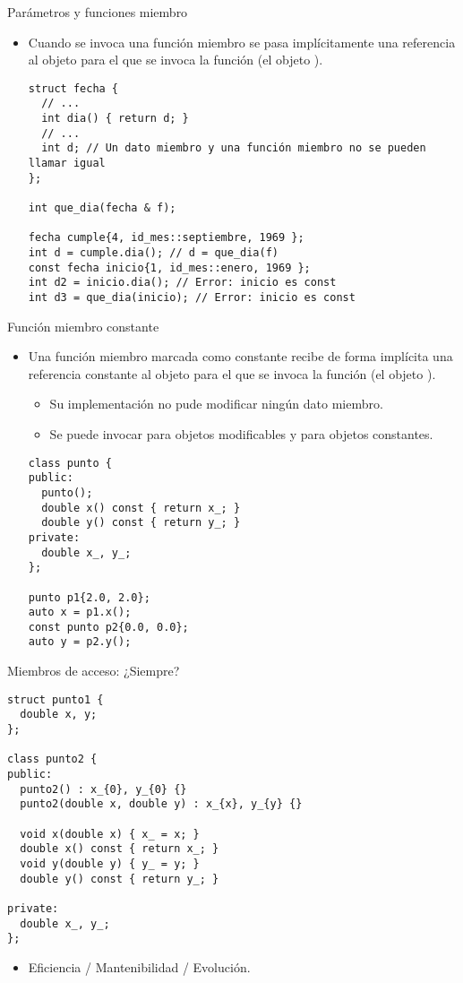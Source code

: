 \begin{frame}[fragile]{Parámetros y funciones miembro}
\begin{itemize}
  \item Cuando se invoca una función miembro se pasa implícitamente una \alert{referencia}
        al objeto para el que se invoca la función (el objeto ).
\begin{lstlisting}
struct fecha {
  // ...
  int dia() { return d; }
  // ...
  int d; // Un dato miembro y una función miembro no se pueden llamar igual
};

int que_dia(fecha & f);

fecha cumple{4, id_mes::septiembre, 1969 };
int d = cumple.dia(); // d = que_dia(f)
const fecha inicio{1, id_mes::enero, 1969 };
int d2 = inicio.dia(); // Error: inicio es const
int d3 = que_dia(inicio); // Error: inicio es const
\end{lstlisting}
\end{itemize}
\end{frame}

\begin{frame}[fragile]{Función miembro constante}
\begin{itemize}
  \item Una función miembro marcada como constante recibe de forma implícita una \alert{referencia constante}
        al objeto para el que se invoca la función (el objeto ).
    \begin{itemize}
      \item Su implementación no pude modificar ningún dato miembro.
      \item Se puede invocar para objetos modificables y para objetos constantes.
    \end{itemize}
\begin{lstlisting}
class punto {
public:
  punto();
  double x() const { return x_; }
  double y() const { return y_; }
private:
  double x_, y_;
};

punto p1{2.0, 2.0};
auto x = p1.x();
const punto p2{0.0, 0.0};
auto y = p2.y();
\end{lstlisting}
\end{itemize}
\end{frame}

\begin{frame}[fragile]{Miembros de acceso: ¿Siempre?}
\begin{lstlisting}
struct punto1 {
  double x, y;
};

class punto2 {
public:
  punto2() : x_{0}, y_{0} {}
  punto2(double x, double y) : x_{x}, y_{y} {}
  
  void x(double x) { x_ = x; }
  double x() const { return x_; }
  void y(double y) { y_ = y; }
  double y() const { return y_; }

private:
  double x_, y_;
};
\end{lstlisting}
\begin{itemize}
  \item Eficiencia / Mantenibilidad / Evolución.
\end{itemize}
\end{frame}

